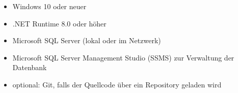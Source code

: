 
\begin{itemize}
    \item Windows 10 oder neuer
    \item .NET Runtime 8.0 oder höher
    \item Microsoft SQL Server (lokal oder im Netzwerk)
    \item Microsoft SQL Server Management Studio (SSMS) zur Verwaltung der Datenbank
    \item optional: Git, falls der Quellcode über ein Repository geladen wird
\end{itemize}